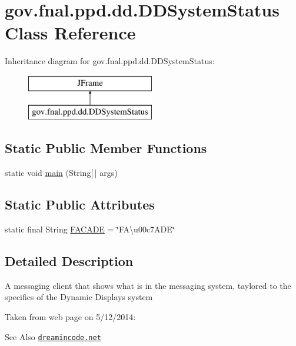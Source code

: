 \hypertarget{classgov_1_1fnal_1_1ppd_1_1dd_1_1DDSystemStatus}{\section{gov.\-fnal.\-ppd.\-dd.\-D\-D\-System\-Status Class Reference}
\label{classgov_1_1fnal_1_1ppd_1_1dd_1_1DDSystemStatus}
}
Inheritance diagram for gov.\-fnal.\-ppd.\-dd.\-D\-D\-System\-Status\-:\begin{figure}[H]
\begin{center}
\leavevmode
\includegraphics[height=2.000000cm]{classgov_1_1fnal_1_1ppd_1_1dd_1_1DDSystemStatus}
\end{center}
\end{figure}
\subsection*{Static Public Member Functions}
\begin{DoxyCompactItemize}
\item 
static void \hyperlink{classgov_1_1fnal_1_1ppd_1_1dd_1_1DDSystemStatus_ad4390f954cf4786ace5e28e4d2235045}{main} (String\mbox{[}$\,$\mbox{]} args)
\end{DoxyCompactItemize}
\subsection*{Static Public Attributes}
\begin{DoxyCompactItemize}
\item 
static final String \hyperlink{classgov_1_1fnal_1_1ppd_1_1dd_1_1DDSystemStatus_aa60dbf33b6f3e62aa0f0a8b1cf5787d5}{F\-A\-C\-A\-D\-E} = \char`\"{}F\-A\textbackslash{}u00c7\-A\-D\-E\char`\"{}
\end{DoxyCompactItemize}


\subsection{Detailed Description}
A messaging client that shows what is in the messaging system, taylored to the specifics of the Dynamic Displays system 

Taken from web page on 5/12/2014\-: \begin{DoxySeeAlso}{See Also}
\href{http://www.dreamincode.net/forums/topic/259777-a-simple-chat-program-with-clientserver-gui-optional/}{\tt dreamincode.\-net} 
\end{DoxySeeAlso}


